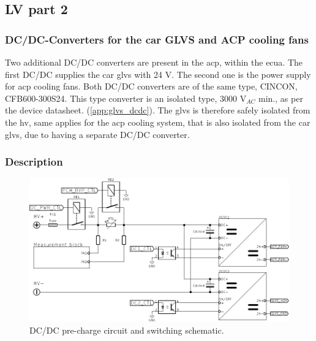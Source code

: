 \subsection{LV part 2}

\subsubsection {DC/DC-Converters for the car GLVS and ACP cooling fans}
Two additional DC/DC converters are present in the \gls{acp}, within the \gls{ecua}. The first DC/DC supplies the car \gls{glvs} with 24 V. The second one is the power supply for \gls{acp} cooling fans. Both DC/DC converters are of the same type, CINCON, CFB600-300S24. This type converter is an isolated type, 3000 V$_{AC}$ min., as per the device datasheet. (\ref{app:glvs_dcdc}). The \gls{glvs} is therefore safely isolated from the \gls{hv}, same applies for the \gls{acp} cooling system, that is also isolated from the car \gls{glvs}, due to having a separate DC/DC converter.

\subsubsection{Description}

\begin{figure}[H]
	\centering
	\includegraphics[width=\textwidth,clip]{./img/ECUA_DCDC_PRECHARGE.pdf}
	\caption{DC/DC pre-charge circuit and switching schematic.}
	\label{fig:precharge_dcdc_sch}
\end{figure}

